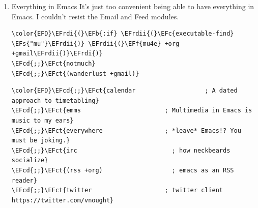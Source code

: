 \documentclass{scrartcl}
\newcommand{\EFs}[1]{\textcolor{EFs}{#1}} %
\newcommand{\EFb}[1]{\textcolor{EFb}{#1}} %
\newcommand{\EFct}[1]{\textcolor{EFct}{#1}} %
\newcommand{\EFc}[1]{\textcolor{EFc}{#1}} %
\newcommand{\EFf}[1]{\textcolor{EFf}{#1}} %
\newcommand{\EFcd}[1]{\textcolor{EFcd}{#1}} %
\newcommand{\EFrdi}[1]{\textcolor{EFrdi}{#1}} %
\newcommand{\EFrdii}[1]{\textcolor{EFrdii}{#1}} %
\begin{document}
\begin{enumerate}
\begin{Code}
\begin{Verbatim}[]
\EFcd{;;}\EFct{scala                      ; java, but good}
\EFcd{;;}\EFct{scheme                     ; a fully conniving family of lisps}
\EFcd{;;}\EFct{sh                         ; she sells \{ba,z,fi\}sh shells on the C xor}
\EFcd{;;}\EFct{sml                        ; no, the /other/ ML}
\EFcd{;;}\EFct{solidity                   ; do you need a blockchain? No.}
\EFcd{;;}\EFct{swift                      ; who asked for emoji variables?}
\EFcd{;;}\EFct{terra                      ; Earth and Moon in alignment for performance.}
\EFcd{;;}\EFct{web                        ; the tubes}
\EFcd{;;}\EFct{yaml                       ; JSON, but readable}
\EFcd{;;}\EFct{zig                        ; C, but simpler}
\end{Verbatim}
\end{Code}

\item Everything in Emacs
\label{sec:org397da39}
It's just too convenient being able to have everything in Emacs.
I couldn't resist the Email and Feed modules.
\begin{Code}
\begin{Verbatim}[]
\color{EFD}\EFrdi{(}\EFb{:if} \EFrdii{(}\EFc{executable-find} \EFs{"mu"}\EFrdii{)} \EFrdii{(}\EFf{mu4e} +org +gmail\EFrdii{)}\EFrdi{)}
\EFcd{;;}\EFct{notmuch}
\EFcd{;;}\EFct{(wanderlust +gmail)}
\end{Verbatim}
\end{Code}

\begin{Code}
\begin{Verbatim}[]
\color{EFD}\EFcd{;;}\EFct{calendar                   ; A dated approach to timetabling}
\EFcd{;;}\EFct{emms                       ; Multimedia in Emacs is music to my ears}
\EFcd{;;}\EFct{everywhere                 ; *leave* Emacs!? You must be joking.}
\EFcd{;;}\EFct{irc                          ; how neckbeards socialize}
\EFcd{;;}\EFct{(rss +org)                   ; emacs as an RSS reader}
\EFcd{;;}\EFct{twitter                    ; twitter client https://twitter.com/vnought}
\end{Verbatim}
\end{Code}
\end{enumerate}
\end{document}
